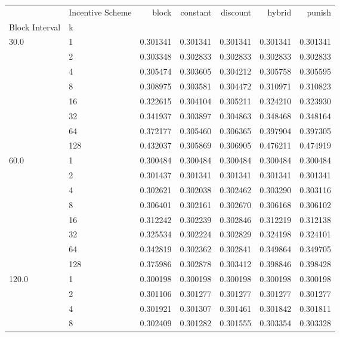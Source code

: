 \begin{tabular}{llrrrrr}
\toprule
      & Incentive Scheme &     block &  constant &  discount &    hybrid &    punish \\
Block Interval & k &           &           &           &           &           \\
\midrule
30.0  & 1   &  0.301341 &  0.301341 &  0.301341 &  0.301341 &  0.301341 \\
      & 2   &  0.303348 &  0.302833 &  0.302833 &  0.302833 &  0.302833 \\
      & 4   &  0.305474 &  0.303605 &  0.304212 &  0.305758 &  0.305595 \\
      & 8   &  0.308975 &  0.303581 &  0.304472 &  0.310971 &  0.310823 \\
      & 16  &  0.322615 &  0.304104 &  0.305211 &  0.324210 &  0.323930 \\
      & 32  &  0.341937 &  0.303897 &  0.304863 &  0.348468 &  0.348164 \\
      & 64  &  0.372177 &  0.305460 &  0.306365 &  0.397904 &  0.397305 \\
      & 128 &  0.432037 &  0.305869 &  0.306905 &  0.476211 &  0.474919 \\
60.0  & 1   &  0.300484 &  0.300484 &  0.300484 &  0.300484 &  0.300484 \\
      & 2   &  0.301437 &  0.301341 &  0.301341 &  0.301341 &  0.301341 \\
      & 4   &  0.302621 &  0.302038 &  0.302462 &  0.303290 &  0.303116 \\
      & 8   &  0.306401 &  0.302161 &  0.302670 &  0.306168 &  0.306102 \\
      & 16  &  0.312242 &  0.302239 &  0.302846 &  0.312219 &  0.312138 \\
      & 32  &  0.325534 &  0.302224 &  0.302829 &  0.324198 &  0.324101 \\
      & 64  &  0.342819 &  0.302362 &  0.302841 &  0.349864 &  0.349705 \\
      & 128 &  0.375986 &  0.302878 &  0.303412 &  0.398846 &  0.398428 \\
120.0 & 1   &  0.300198 &  0.300198 &  0.300198 &  0.300198 &  0.300198 \\
      & 2   &  0.301106 &  0.301277 &  0.301277 &  0.301277 &  0.301277 \\
      & 4   &  0.301921 &  0.301307 &  0.301461 &  0.301842 &  0.301811 \\
      & 8   &  0.302409 &  0.301282 &  0.301555 &  0.303354 &  0.303328 \\

\end{tabular}
